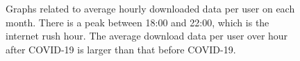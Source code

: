 \begin{figure}[t]
  \caption{Graphs related to average hourly downloaded data per user on each month. There is a peak between 18:00 and 22:00, which is the internet rush hour. The average download data per user over hour after COVID-19 is larger than that before COVID-19.}
  \label{fig:download-data-per-user-hours-fig} 
\end{figure}




        
